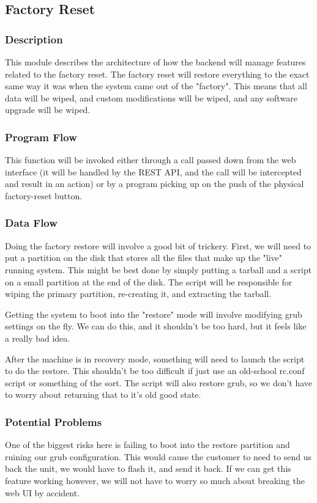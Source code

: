
\subsection{Factory Reset}

\subsubsection{Description}

This module describes the architecture of how the backend will manage features related to the factory reset.
The factory reset will restore everything to the exact same way it was when the system came out of the "factory".
This means that all data will be wiped, and custom modifications will be wiped, and any software upgrade will be wiped.

\subsubsection{Program Flow}

This function will be invoked either through a call passed down from the web interface (it will be handled by the REST API, and the call will be intercepted and result in an action) or by a program picking up on the push of the physical factory-reset button.

\subsubsection{Data Flow}

Doing the factory restore will involve a good bit of trickery. 
First, we will need to put a partition on the disk that stores all the files that make up the "live" running system. 
This might be best done by simply putting a tarball and a script on a small partition at the end of the disk. 
The script will be responsible for wiping the primary partition, re-creating it, and extracting the tarball.

Getting the system to boot into the "restore" mode will involve modifying grub settings on the fly. 
We can do this, and it shouldn't be too hard, but it feels like a really bad idea.

After the machine is in recovery mode, something will need to launch the script to do the restore.
This shouldn't be too difficult if just use an old-school rc.conf script or something of the sort.
The script will also restore grub, so we don't have to worry about returning that to it's old good state.

\subsubsection{Potential Problems}

One of the biggest risks here is failing to boot into the restore partition and ruining our grub configuration.
This would cause the customer to need to send us back the unit, we would have to flash it, and send it back.
If we can get this feature working however, we will not have to worry so much about breaking the web UI by accident.
